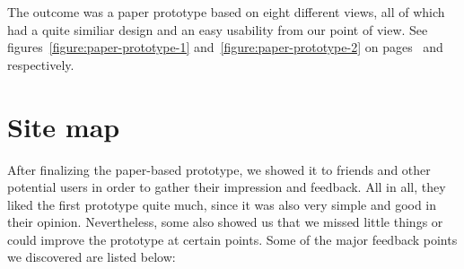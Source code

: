 \documentclass[11pt,twoside,a4paper]{report}
\begin{document}
The outcome was a paper prototype based on eight different views, all of which had a quite similiar design and an easy usability from our point of view. See figures~\ref{figure:paper-prototype-1} and~\ref{figure:paper-prototype-2} on pages~\pageref{figure:paper-prototype-1} and~\pageref{figure:paper-prototype-2} respectively.

\section{Site map}

After finalizing the paper-based prototype, we showed it to friends and other potential users in order to gather their impression and feedback. All in all, they liked the first prototype quite much, since it was also very simple and good in their opinion. Nevertheless, some also showed us that we missed little things or could improve the prototype at certain points. Some of the major feedback points we discovered are listed below:
\end{document}

